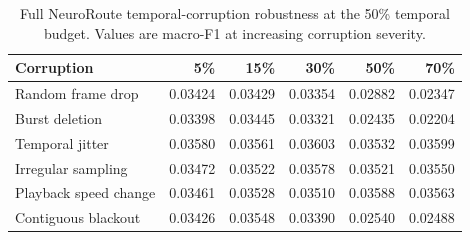 
\begin{table}[t]
\centering
\caption{Full NeuroRoute temporal-corruption robustness at the 50\% temporal
budget. Values are macro-F1 at increasing corruption severity.}
\label{tab:full_robustness}
\begin{tabular}{lrrrrr}
\toprule
Corruption & 5\% & 15\% & 30\% & 50\% & 70\%\\
\midrule
Random frame drop & 0.03424 & 0.03429 & 0.03354 & 0.02882 & 0.02347 \\
Burst deletion & 0.03398 & 0.03445 & 0.03321 & 0.02435 & 0.02204 \\
Temporal jitter & 0.03580 & 0.03561 & 0.03603 & 0.03532 & 0.03599 \\
Irregular sampling & 0.03472 & 0.03522 & 0.03578 & 0.03521 & 0.03550 \\
Playback speed change & 0.03461 & 0.03528 & 0.03510 & 0.03588 & 0.03563 \\
Contiguous blackout & 0.03426 & 0.03548 & 0.03390 & 0.02540 & 0.02488 \\
\bottomrule
\end{tabular}
\end{table}
